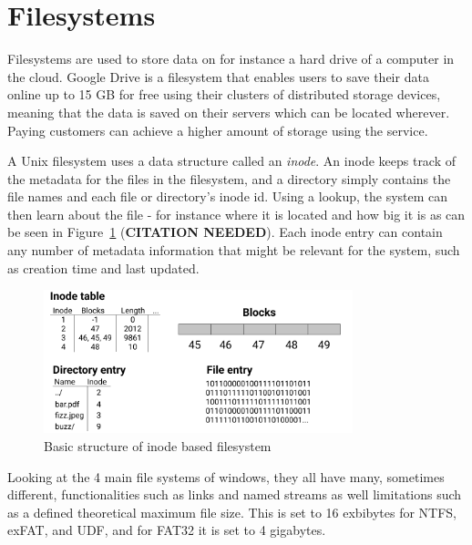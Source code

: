\section{Filesystems}
Filesystems are used to store data on for instance a hard drive of a computer in the cloud. Google Drive is a filesystem that enables users to save their data online up to 15 GB for free\cite{CloudStorageWork} using their clusters of distributed storage devices, meaning that the data is saved on their servers which can be located wherever\cite{DistributedStorageWhat}. Paying customers can achieve a higher amount of storage using the service.

A Unix filesystem uses a data structure called an \textit{inode}. An inode keeps track of the metadata for the files in the filesystem, and a directory simply contains the file names and each file or directory's inode id. Using a lookup, the system can then learn about the file - for instance where it is located and how big it is as can be seen in Figure~\ref{fig:inode_diag} (\textbf{CITATION NEEDED}). Each inode entry can contain any number of metadata information that might be relevant for the system, such as creation time and last updated.

\begin{figure}[!ht]
	\begin{center}
	  \includegraphics[width=0.8\textwidth]{figures/inode_diagram.png}
	\end{center}
	\caption{Basic structure of inode based filesystem}
	\label{fig:inode_diag}
\end{figure}

Looking at the 4 main file systems of windows, they all have many, sometimes different, functionalities such as links and named streams as well limitations such as a defined theoretical maximum file size\cite{mikbenFileSystemFunctionality}. This is set to 16 exbibytes for NTFS, exFAT, and UDF, and for FAT32 it is set to 4 gigabytes. 


